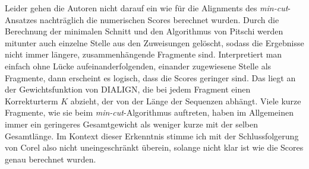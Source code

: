Leider gehen die Autoren nicht darauf ein wie für die Alignments des \emph{min-cut}-Ansatzes nachträglich die numerischen Scores berechnet wurden. Durch die Berechnung der minimalen Schnitt und den Algorithmus von Pitschi werden mitunter auch einzelne Stelle aus den Zuweisungen gelöscht, sodass die Ergebnisse nicht immer längere, zusammenhängende Fragmente sind. Interpretiert man einfach ohne Lücke aufeinanderfolgenden, einander zugewiesene Stelle als Fragmente, dann erscheint es logisch, dass die Scores geringer sind. Das liegt an der Gewichtsfunktion von DIALIGN, die bei jedem Fragment einen Korrekturterm $K$ abzieht, der von der Länge der Sequenzen abhängt. Viele kurze Fragmente, wie sie beim \emph{min-cut}-Algorithmus auftreten, haben im Allgemeinen immer ein geringeres Gesamtgewicht als weniger kurze mit der selben Gesamtlänge. Im Kontext dieser Erkenntnis stimme ich mit der Schlussfolgerung von Corel also nicht uneingeschränkt überein, solange nicht klar ist wie die Scores genau berechnet wurden.